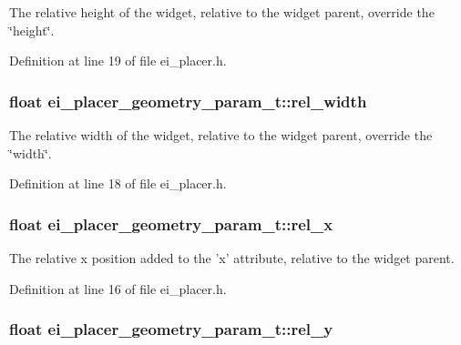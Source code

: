 The relative height of the widget, relative to the widget parent, override the \char`\"{}height\char`\"{}. 



Definition at line 19 of file ei\+\_\+placer.\+h.

\hypertarget{structei__placer__geometry__param__t_a6db90e24dd410aba70d28601c4a45848}{
\subsubsection[{rel\+\_\+width}]{\setlength{\rightskip}{0pt plus 5cm}float ei\+\_\+placer\+\_\+geometry\+\_\+param\+\_\+t\+::rel\+\_\+width}}\label{structei__placer__geometry__param__t_a6db90e24dd410aba70d28601c4a45848}


The relative width of the widget, relative to the widget parent, override the \char`\"{}width\char`\"{}. 



Definition at line 18 of file ei\+\_\+placer.\+h.

\hypertarget{structei__placer__geometry__param__t_a7ef1944c9e941e32ecc97b06d93ccde2}{
\subsubsection[{rel\+\_\+x}]{\setlength{\rightskip}{0pt plus 5cm}float ei\+\_\+placer\+\_\+geometry\+\_\+param\+\_\+t\+::rel\+\_\+x}}\label{structei__placer__geometry__param__t_a7ef1944c9e941e32ecc97b06d93ccde2}


The relative x position added to the 'x' attribute, relative to the widget parent. 



Definition at line 16 of file ei\+\_\+placer.\+h.

\hypertarget{structei__placer__geometry__param__t_a0cf562b8ca4f89fc1cad3295597e281f}{
\subsubsection[{rel\+\_\+y}]{\setlength{\rightskip}{0pt plus 5cm}float ei\+\_\+placer\+\_\+geometry\+\_\+param\+\_\+t\+::rel\+\_\+y}}\label{structei__placer__geometry__param__t_a0cf562b8ca4f89fc1cad3295597e281f}


